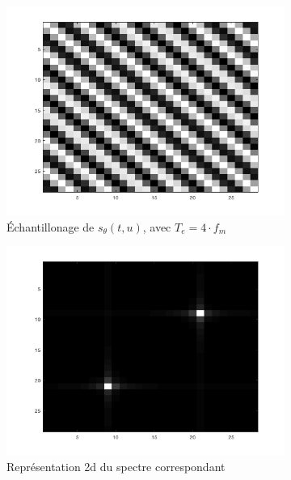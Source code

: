 \documentclass[a4paper]{article}
\begin{document}
\begin{figure}[H]
    \centering
    \begin{subfigure}[c]{0.46\textwidth}
        \centering
        \includegraphics[width=\textwidth]{images/sin-e5.png}
        \caption{Échantillonage de $s_{\theta}(t,u)$, avec $T_e= 4 \cdot f_m$}
    \label{subimg:sin-4-e}
    \end{subfigure}
    \begin{subfigure}[c]{0.46\textwidth}
        \centering
        \includegraphics[width=\textwidth]{images/ft52D.png}
        \caption{Représentation 2d du spectre correspondant}
    \label{subimg:ft-4-2D}
    \end{subfigure}
    \begin{subfigure}[c]{0.46\textwidth}

\end{subfigure}
\end{figure}
\end{document}
